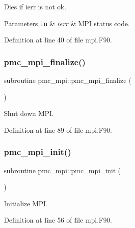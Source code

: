 Dies if {\ttfamily ierr} is not ok. 


\begin{DoxyParams}[1]{Parameters}
\mbox{\tt in}  & {\em ierr} & M\+PI status code. \\
\hline
\end{DoxyParams}


Definition at line 40 of file mpi.\+F90.

\mbox{\label{namespacepmc__mpi_a9c6189f38473985f2db47a9a6ecce869}} 
\subsubsection{\texorpdfstring{pmc\+\_\+mpi\+\_\+finalize()}{pmc\_mpi\_finalize()}}
{\footnotesize\ttfamily subroutine pmc\+\_\+mpi\+::pmc\+\_\+mpi\+\_\+finalize (\begin{DoxyParamCaption}{ }\end{DoxyParamCaption})}



Shut down M\+PI. 



Definition at line 89 of file mpi.\+F90.

\mbox{\label{namespacepmc__mpi_a44c84d31a3ed394dc39113fb8232221f}} 
\subsubsection{\texorpdfstring{pmc\+\_\+mpi\+\_\+init()}{pmc\_mpi\_init()}}
{\footnotesize\ttfamily subroutine pmc\+\_\+mpi\+::pmc\+\_\+mpi\+\_\+init (\begin{DoxyParamCaption}{ }\end{DoxyParamCaption})}



Initialize M\+PI. 



Definition at line 56 of file mpi.\+F90.

\mbox{\label{namespacepmc__mpi_a5a62099ffca12da0a704c7882eae5a68}} 
